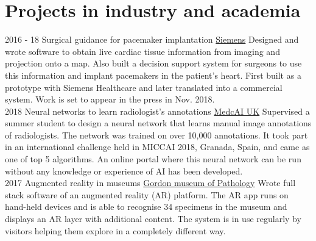 \documentclass[letterpaper]{twentysecondcv} %
\begin{document}
\section{Projects in industry and academia}
\begin{twenty}
	\twentyitem
    	{2016 - 18}
		{}
        {Surgical guidance for pacemaker implantation}
        {\href{https://www.healthcare.siemens.co.uk/about}{Siemens}}
        {}
        {
		Designed and wrote software to obtain live cardiac tissue information from imaging and projection onto a map. Also built a decision support system for surgeons to use this information and implant pacemakers in the patient's heart. First built as a prototype with Siemens Healthcare and later translated into a commercial system. Work is set to appear in the press in Nov. 2018.}
		\\
	\twentyitem
    	{2018}
		{}
        {Neural networks to learn radiologist's annotations}
        {\href{http://www.medcai.co.uk}{MedcAI UK}}
        {
		Supervised a summer student to design a neural network that learns manual image annotations of radiologists. The network was trained on over 10,000 annotations. It took part in an international challenge held in MICCAI 2018, Granada, Spain, and came as one of top 5 algorithms. An online portal where this neural network can be run without any knowledge or experience of AI has been developed.}
		\\
	\twentyitem
    	{2017}
		{}
        {Augmented reality in museums}
        {\href{https://www.kcl.ac.uk/gordon/index.aspx}{Gordon museum of Pathology}}
        {
		Wrote full stack software of an augmented reality (AR) platform. The AR app runs on hand-held devices and is able to recognise 34 specimens in the museum and displays an AR layer with additional content. The system is in use regularly by visitors helping them explore in a completely different way. }
		\\ 


\end{twenty}
\end{document}

